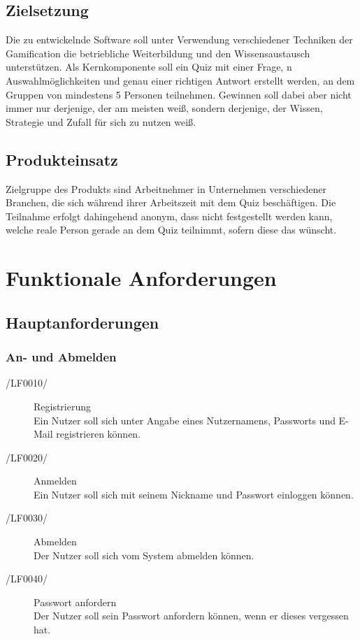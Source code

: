 \documentclass[11pt,a4paper]{scrreprt}
\begin{document}
\section{Zielsetzung}
Die zu entwickelnde Software soll unter Verwendung verschiedener Techniken der Gamification die betriebliche Weiterbildung und den Wissensaustausch unterstützen.
Als Kernkomponente soll ein Quiz mit einer Frage, n Auswahlmöglichkeiten und genau einer richtigen Antwort erstellt werden, an dem Gruppen von mindestens 5 Personen teilnehmen.
Gewinnen soll dabei aber nicht immer nur derjenige, der am meisten weiß, sondern derjenige, der Wissen, Strategie und Zufall für sich zu nutzen weiß.
\section{Produkteinsatz}
Zielgruppe des Produkts sind Arbeitnehmer in Unternehmen verschiedener Branchen, die sich während ihrer Arbeitszeit mit dem Quiz beschäftigen. Die Teilnahme erfolgt dahingehend anonym, dass nicht festgestellt werden kann, welche reale Person gerade an dem Quiz teilnimmt, sofern diese das wünscht.

\chapter{Funktionale Anforderungen}
\section{Hauptanforderungen}
\subsection{An- und Abmelden}
\begin{description}
\item[/LF0010/] Registrierung \\
Ein Nutzer soll sich unter Angabe eines Nutzernamens, Passworts und E-Mail registrieren können.
\item[/LF0020/] Anmelden \\
Ein Nutzer soll sich mit seinem Nickname und Passwort einloggen können.
\item[/LF0030/] Abmelden \\
Der Nutzer soll sich vom System abmelden können.
\item[/LF0040/] Passwort anfordern \\
Der Nutzer soll sein Passwort anfordern können, wenn er dieses vergessen hat.
\end{description}
\end{document}
